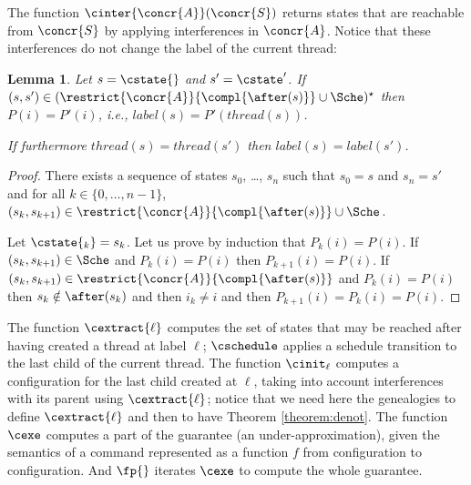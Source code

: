 \documentclass[12pt]{article}
\let\firstunion\cup
\let\cup\firstunion
\newcommand{\lbl}{\mathit{label}}
\newcommand{\thread}{\mathit{thread}}
\newtheorem{lemma}{Lemma}
\begin{document}
The function \(\cinter{\concr{A}}(\concr{S})\) returns states that are reachable from \(\concr{S}\) by applying interferences in \(\concr{A}\).
Notice that these interferences do not change the label of the current thread:
\begin{lemma}\label{lemma:B}
 Let \(s=\cstate{}\) and \(s'=\cstate'\).
 If \((s,s') \in ( \restrict{\concr{A}}{\compl{\after(s)}}\cup\Sche )^{\star}\) then \(P(i)=P'(i)\), i.e., \(\lbl(s)=P'(\thread(s))\). 
 
 If furthermore \(\thread(s)=\thread(s')\) then \(\lbl(s)=\lbl(s')\).
\end{lemma}
\begin{proof}
 There exists a sequence of states \(s_0\), \ldots, \(s_n\) such that \(s_0=s\) and \(s_n=s'\) and for all \(k\in\{0,\ldots,n-1\}\), \((s_k,s_{k+1})\in \restrict{\concr{A}}{\compl{\after(s)}}\cup\Sche\).
 
 Let \(\cstate{_k}=s_k\). Let us prove by induction that \(P_k(i)=P(i)\).
If \((s_k,s_{k+1})\in\Sche\) and \(P_k(i)=P(i)\) then \(P_{k+1}(i)=P(i)\).
If \((s_k,s_{k+1})\in \restrict{\concr{A}}{\compl{\after(s)}}\) and \(P_k(i)=P(i)\) then \(s_k\notin\after(s_k)\) and then \(i_k\neq i\) and then \(P_{k+1}(i)=P_{k}(i)=P(i)\).
\end{proof}

  
  
The function 
\(\cextract{\ell}\) computes the set of states that may be reached after having created a thread at label \(\ell\); \(\cschedule\) applies a schedule transition to the last child of the current thread. The function \(\cinit_{\ell}\) computes a configuration for the last child created at \(\ell\), taking into account interferences with its parent using \(\cextract{\ell}\); notice that we need here the genealogies to define \(\cextract{\ell}\) and then to have Theorem \ref{theorem:denot}. 
The function \(\cexe\) computes a part of the guarantee (an under-approximation), given the semantics of a command represented as a function \(f\) from configuration to configuration. And \(\fp{}\) iterates \(\cexe\) to compute the whole guarantee. 
\end{document}
